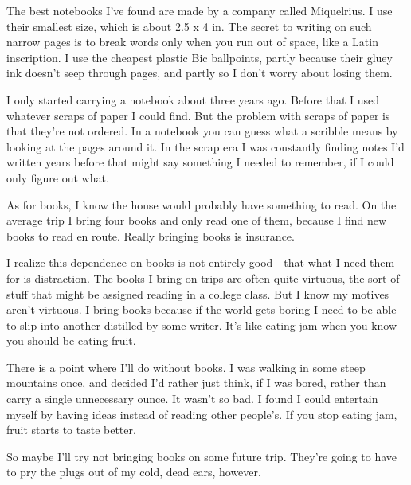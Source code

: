 The best notebooks I've found are made by a company called Miquelrius. I
use their smallest size, which is about 2.5 x 4 in. The secret to
writing on such narrow pages is to break words only when you run out of
space, like a Latin inscription. I use the cheapest plastic Bic
ballpoints, partly because their gluey ink doesn't seep through pages,
and partly so I don't worry about losing them.

I only started carrying a notebook about three years ago. Before that I
used whatever scraps of paper I could find. But the problem with scraps
of paper is that they're not ordered. In a notebook you can guess what a
scribble means by looking at the pages around it. In the scrap era I was
constantly finding notes I'd written years before that might say
something I needed to remember, if I could only figure out what.

As for books, I know the house would probably have something to read. On
the average trip I bring four books and only read one of them, because I
find new books to read en route. Really bringing books is insurance.

I realize this dependence on books is not entirely good---that what I
need them for is distraction. The books I bring on trips are often quite
virtuous, the sort of stuff that might be assigned reading in a college
class. But I know my motives aren't virtuous. I bring books because if
the world gets boring I need to be able to slip into another distilled
by some writer. It's like eating jam when you know you should be eating
fruit.

There is a point where I'll do without books. I was walking in some
steep mountains once, and decided I'd rather just think, if I was bored,
rather than carry a single unnecessary ounce. It wasn't so bad. I found
I could entertain myself by having ideas instead of reading other
people's. If you stop eating jam, fruit starts to taste better.

So maybe I'll try not bringing books on some future trip. They're going
to have to pry the plugs out of my cold, dead ears, however.
